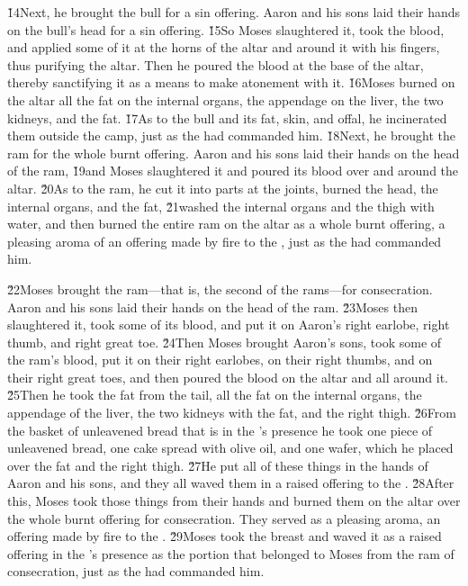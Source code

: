\v{14}Next, he brought the bull for a sin offering. Aaron and his sons laid their hands on the bull's head for a sin offering. \v{15}So Moses slaughtered it, took the blood, and applied some of it at the horns of the altar and around it with his fingers, thus purifying the altar. Then he poured the blood at the base of the altar, thereby sanctifying it as a means to make atonement with it. \v{16}Moses burned on the altar all the fat on the internal organs, the appendage on the liver, the two kidneys, and the fat. \v{17}As to the bull and its fat, skin, and offal, he incinerated them outside the camp, just as the  had commanded him. \v{18}Next, he brought the ram for the whole burnt offering. Aaron and his sons laid their hands on the head of the ram, \v{19}and Moses slaughtered it and poured its blood over and around the altar. \v{20}As to the ram, he cut it into parts at the joints, burned the head, the internal organs, and the fat, \v{21}washed the internal organs and the thigh with water, and then burned the entire ram on the altar as a whole burnt offering, a pleasing aroma of an offering made by fire to the , just as the  had commanded him.

\v{22}Moses brought the ram---that is, the second of the rams---for consecration. Aaron and his sons laid their hands on the head of the ram. \v{23}Moses then slaughtered it, took some of its blood, and put it on Aaron's right earlobe, right thumb, and right great toe. \v{24}Then Moses brought Aaron's sons, took some of the ram's blood, put it on their right earlobes, on their right thumbs, and on their right great toes, and then poured the blood on the altar and all around it. \v{25}Then he took the fat from the tail, all the fat on the internal organs, the appendage of the liver, the two kidneys with the fat, and the right thigh. \v{26}From the basket of unleavened bread that is in the 's presence he took one piece of unleavened bread, one cake spread with olive oil, and one wafer, which he placed over the fat and the right thigh. \v{27}He put all of these things in the hands of Aaron and his sons, and they all waved them in a raised offering to the . \v{28}After this, Moses took those things from their hands and burned them on the altar over the whole burnt offering for consecration. They served as a pleasing aroma, an offering made by fire to the . \v{29}Moses took the breast and waved it as a raised offering in the 's presence as the portion that belonged to Moses from the ram of consecration, just as the  had commanded him.

